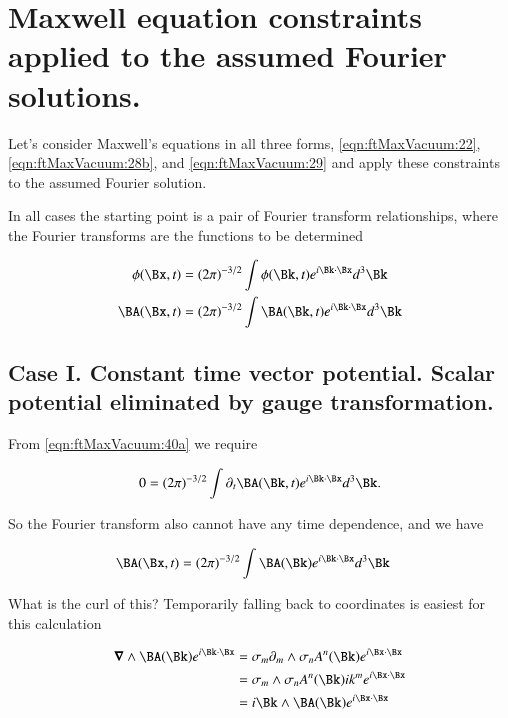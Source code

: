 \section{Maxwell equation constraints applied to the assumed Fourier solutions.}

Let's consider Maxwell's equations in all three forms, \autoref{eqn:ftMaxVacuum:22}, \autoref{eqn:ftMaxVacuum:28b}, and \autoref{eqn:ftMaxVacuum:29} and apply these constraints to the assumed Fourier solution.

In all cases the starting point is a pair of Fourier transform relationships, where the Fourier transforms are the functions to be determined

\begin{subequations}
\label{eqn:ftMaxVacuum:40}
\begin{align}
\phi(\Bx, t) &= (2 \pi)^{-3/2} \int \phi(\Bk, t) e^{i \Bk \cdot \Bx } d^3 \Bk 
\label{eqn:ftMaxVacuum:40a}
\\
\BA(\Bx, t) &= (2 \pi)^{-3/2} \int \BA(\Bk, t) e^{i \Bk \cdot \Bx } d^3 \Bk 
\label{eqn:ftMaxVacuum:40b}
\end{align}
\end{subequations}

\subsection{Case I.  Constant time vector potential.  Scalar potential eliminated by gauge transformation.}

From \autoref{eqn:ftMaxVacuum:40a} we require

\begin{align}\label{eqn:ftMaxVacuum:50}
0 = (2 \pi)^{-3/2} \int \partial_t \BA(\Bk, t) e^{i \Bk \cdot \Bx } d^3 \Bk.
\end{align}

So the Fourier transform also cannot have any time dependence, and we have

\begin{align}\label{eqn:ftMaxVacuum:51}
\BA(\Bx, t) &= (2 \pi)^{-3/2} \int \BA(\Bk) e^{i \Bk \cdot \Bx } d^3 \Bk 
\end{align}

What is the curl of this?  Temporarily falling back to coordinates is easiest for this calculation

\begin{align*}
\spacegrad \wedge \BA(\Bk) e^{i\Bk \cdot \Bx}
&=
\sigma_m \partial_m \wedge \sigma_n A^n(\Bk) e^{i \Bx \cdot \Bx} \\
&=
\sigma_m \wedge \sigma_n A^n(\Bk) i k^m e^{i \Bx \cdot \Bx} \\
&=
i\Bk \wedge \BA(\Bk) e^{i \Bx \cdot \Bx} \\
\end{align*}

